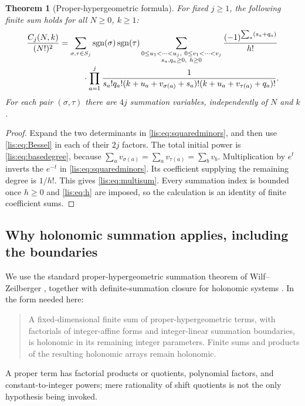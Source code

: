 \documentclass[11pt,letterpaper]{article}
\numberwithin{equation}{section}
\newtheorem{theorem}{Theorem}[section]
\theoremstyle{definition}
\DeclareMathOperator{\sgn}{sgn}
\begin{document}
\begin{theorem}[Proper-hypergeometric formula]\label{lis:thm:multisum}
For fixed $j\ge1$, the following finite sum holds for all $N\ge0$, $k\ge1$:
\begin{align}
 \frac{C_j(N,k)}{(N!)^2}
 &=\sum_{\sigma,\tau\in S_j}\sgn(\sigma)\sgn(\tau)
   \sum_{\substack{0\le u_1<\cdots<u_j,\ 0\le v_1<\cdots<v_j\\
                    s_a,q_a\ge0,\ h\ge0}}
      \frac{(-1)^{\sum_a(s_a+q_a)}}{h!}\notag\\[-2pt]
 &\hspace{1.0cm}\cdot
   \prod_{a=1}^{j}\frac{1}{s_a!q_a!
          (k+u_a+v_{\sigma(a)}+s_a)!
          (k+u_a+v_{\tau(a)}+q_a)!}.
 \label{lis:eq:multisum}
\end{align}
For each pair $(\sigma,\tau)$ there are $4j$ summation variables,
independently of $N$ and $k$.
\end{theorem}
\begin{proof}
Expand the two determinants in \eqref{lis:eq:squaredminors}, and then use
\eqref{lis:eq:Bessel} in each of their $2j$ factors. The total initial
power is \eqref{lis:eq:basedegree}, because
$\sum_a v_{\sigma(a)}=\sum_a v_{\tau(a)}=\sum_bv_b$.
Multiplication by $e^t$ inverts the $e^{-t}$ in \eqref{lis:eq:squaredminors}.
Its coefficient supplying the remaining degree is $1/h!$. This gives
\eqref{lis:eq:multisum}. Every summation index is bounded once $h\ge0$
and \eqref{lis:eq:h} are imposed, so the calculation is an identity of
finite coefficient sums.
\end{proof}

\subsection{Why holonomic summation applies, including the boundaries}
We use the standard proper-hypergeometric summation theorem of
Wilf--Zeilberger \cite[Section 2, Theorem 1 and Corollary A]{WZ}, together
with definite-summation closure for holonomic systems
\cite[Theorem 2 and Section 4]{Koutschan}. In the form needed here:
\begin{quote}
A fixed-dimensional finite sum of proper-hypergeometric terms, with
factorials of integer-affine forms and integer-linear summation boundaries,
is holonomic in its remaining integer parameters. Finite sums and
products of the resulting holonomic arrays remain holonomic.
\end{quote}
A proper term has factorial products or quotients, polynomial factors,
and constant-to-integer powers; mere rationality of shift quotients is
not the only hypothesis being invoked.
\end{document}
